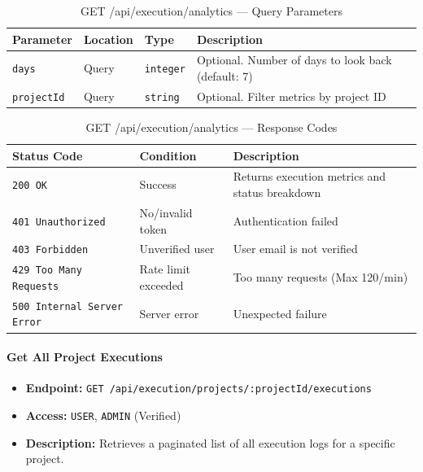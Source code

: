 \begin{table}[H]
\centering
\renewcommand{\arraystretch}{1.3}
\begin{tabularx}{\textwidth}{|l|l|l|X|}
\hline
\textbf{Parameter} & \textbf{Location} & \textbf{Type} & \textbf{Description} \\
\hline
\texttt{days}      & Query & \texttt{integer} & Optional. Number of days to look back (default: 7) \\
\hline
\texttt{projectId} & Query & \texttt{string}  & Optional. Filter metrics by project ID \\
\hline
\end{tabularx}
\caption{GET /api/execution/analytics — Query Parameters}
\label{tab:get-execution-analytics-params}
\end{table}

\begin{table}[H]
\centering
\renewcommand{\arraystretch}{1.3}
\begin{tabularx}{\textwidth}{|l|l|X|}
\hline
\textbf{Status Code} & \textbf{Condition} & \textbf{Description} \\
\hline
\texttt{200 OK}           & Success      & Returns execution metrics and status breakdown \\
\hline
\texttt{401 Unauthorized} & No/invalid token & Authentication failed \\
\hline
\texttt{403 Forbidden}    & Unverified user  & User email is not verified \\
\hline
\texttt{429 Too Many Requests} & Rate limit exceeded & Too many requests (Max 120/min) \\
\hline
\texttt{500 Internal Server Error} & Server error & Unexpected failure \\
\hline
\end{tabularx}
\caption{GET /api/execution/analytics — Response Codes}
\label{tab:get-execution-analytics-responses}
\end{table}
\FloatBarrier

\paragraph{Get All Project Executions}
\label{subsubsec:get-all-project-executions}

\begin{itemize}
  \item \textbf{Endpoint:} \texttt{GET /api/execution/projects/:projectId/executions}
  \item \textbf{Access:} \texttt{USER}, \texttt{ADMIN} (Verified)
  \item \textbf{Description:} Retrieves a paginated list of all execution logs for a specific project.
\end{itemize}

